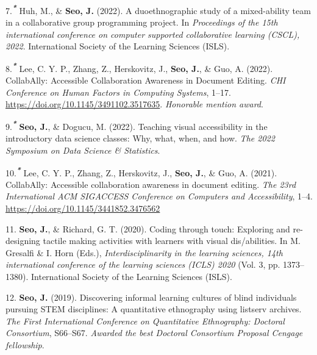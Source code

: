\documentclass[11pt,a4paper,]{awesome-cv}
\begin{document}
\leavevmode{}%
7.\textsuperscript{\textbf{\emph{*}}} Huh, M., \& \textbf{Seo, J.}
(2022). A duoethnographic study of a mixed-ability team in a
collaborative group programming project. In \emph{Proceedings of the
15th international conference on computer supported collaborative
learning (CSCL), 2022}. International Society of the Learning Sciences
(ISLS).

\leavevmode{}%
8.\textsuperscript{\textbf{\emph{*}}} Lee, C. Y. P., Zhang, Z.,
Herskovitz, J., \textbf{Seo, J.}, \& Guo, A. (2022). CollabAlly:
Accessible Collaboration Awareness in Document Editing. \emph{CHI
Conference on Human Factors in Computing Systems}, 1--17.
\url{https://doi.org/10.1145/3491102.3517635}. \emph{Honorable mention
award}.

\leavevmode{}%
9.\textsuperscript{\textbf{\emph{*}}} \textbf{Seo, J.}, \& Dogucu, M.
(2022). Teaching visual accessibility in the introductory data science
classes: Why, what, when, and how. \emph{The 2022 Symposium on Data
Science \& Statistics}.

\leavevmode{}%
10.\textsuperscript{\textbf{\emph{*}}} Lee, C. Y. P., Zhang, Z.,
Herskovitz, J., \textbf{Seo, J.}, \& Guo, A. (2021). CollabAlly:
Accessible collaboration awareness in document editing. \emph{The 23rd
International ACM SIGACCESS Conference on Computers and Accessibility},
1--4. \url{https://doi.org/10.1145/3441852.3476562}

\leavevmode{}%
11. \textbf{Seo, J.}, \& Richard, G. T. (2020). Coding through touch:
Exploring and re-designing tactile making activities with learners with
visual dis/abilities. In M. Gresalfi \& I. Horn (Eds.),
\emph{Interdisciplinarity in the learning sciences, 14th international
conference of the learning sciences (ICLS) 2020} (Vol. 3, pp.
1373--1380). International Society of the Learning Sciences (ISLS).

\leavevmode{}%
12. \textbf{Seo, J.} (2019). Discovering informal learning cultures of
blind individuals pursuing STEM disciplines: A quantitative ethnography
using listserv archives. \emph{The First International Conference on
Quantitative Ethnography: Doctoral Consortium}, S66--S67. \emph{Awarded
the best Doctoral Consortium Proposal Cengage fellowship}.
\end{document}
